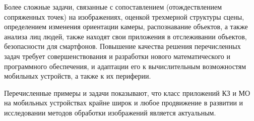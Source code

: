 Более сложные задачи, связанные с сопоставлением (отождествлением сопряженных точек) на изображениях, оценкой трехмерной структуры сцены, определением изменения ориентации камеры, распознавание объектов, а также анализа лиц людей, также находят свои приложения в отслеживании объектов, безопасности для смартфонов. Повышение качества решения перечисленных задач требует совершенствования и разработки нового математического и программного обеспечения, и адаптации его к вычислительным возможностям мобильных устройств, а также к их периферии.

Перечисленные примеры и задачи показывают, что класс приложений КЗ и МО на мобильных устройствах крайне широк и любое продвижение в развитии и исследовании методов обработки изображений является актуальным.

